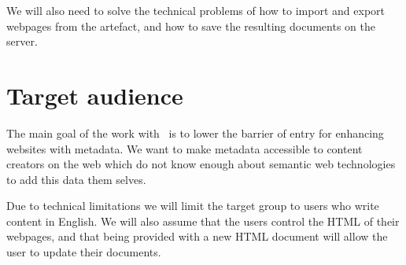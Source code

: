 We will also need to solve the technical problems of how to import and export webpages from the artefact,
and how to save the resulting documents on the server.


%
%
%
%

\section{Target audience}
The main goal of the work with \theartefact\ is to lower the barrier of entry for enhancing websites with metadata.
We want to make metadata accessible to content creators on the web which do not know enough about semantic web technologies
to add this data them selves.

Due to technical limitations we will limit the target group to users who write content in English.
We will also assume that the users control the HTML of their webpages,
and that being provided with a new HTML document will allow the user to update their documents.

